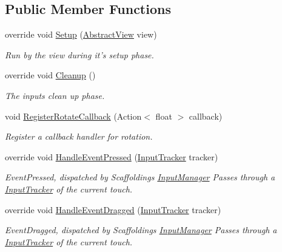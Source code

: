 \subsection*{Public Member Functions}
\begin{DoxyCompactItemize}
\item 
override void \hyperlink{class_scaffolding_1_1_rotate_input_a89be6ed5c624ff8f637fdc38227c4637}{Setup} (\hyperlink{class_scaffolding_1_1_abstract_view}{Abstract\+View} view)
\begin{DoxyCompactList}\small\item\em Run by the view during it's setup phase. \end{DoxyCompactList}\item 
override void \hyperlink{class_scaffolding_1_1_rotate_input_a85778a91b86665998c1b84f24c571e88}{Cleanup} ()
\begin{DoxyCompactList}\small\item\em The inputs clean up phase. \end{DoxyCompactList}\item 
void \hyperlink{class_scaffolding_1_1_rotate_input_a07b51f4f3db3e4e041f45a011319f8d9}{Register\+Rotate\+Callback} (Action$<$ float $>$ callback)
\begin{DoxyCompactList}\small\item\em Register a callback handler for rotation. \end{DoxyCompactList}\item 
override void \hyperlink{class_scaffolding_1_1_rotate_input_a4c37089dcaae6d1cb1785b45d5cec8b3}{Handle\+Event\+Pressed} (\hyperlink{class_scaffolding_1_1_input_tracker}{Input\+Tracker} tracker)
\begin{DoxyCompactList}\small\item\em Event\+Pressed, dispatched by Scaffoldings \hyperlink{class_scaffolding_1_1_input_manager}{Input\+Manager} Passes through a \hyperlink{class_scaffolding_1_1_input_tracker}{Input\+Tracker} of the current touch. \end{DoxyCompactList}\item 
override void \hyperlink{class_scaffolding_1_1_rotate_input_afffb85f2f27b314bde50d0e45d6117d5}{Handle\+Event\+Dragged} (\hyperlink{class_scaffolding_1_1_input_tracker}{Input\+Tracker} tracker)
\begin{DoxyCompactList}\small\item\em Event\+Dragged, dispatched by Scaffoldings \hyperlink{class_scaffolding_1_1_input_manager}{Input\+Manager} Passes through a \hyperlink{class_scaffolding_1_1_input_tracker}{Input\+Tracker} of the current touch. \end{DoxyCompactList}\item 

\end{DoxyCompactItemize}
